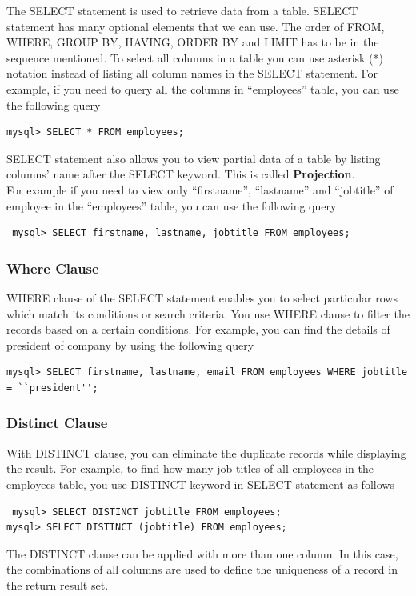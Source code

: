 \documentclass[11pt,a4paper]{article}
\begin{document}
\vspace{5in}

The SELECT statement is used to retrieve data from a table. SELECT statement has many optional elements that we can use. The order of FROM, WHERE, GROUP
BY, HAVING, ORDER BY and LIMIT has to be in the sequence mentioned.
To select all columns in a table you can use asterisk (*) notation instead of listing all column names in the SELECT statement.
For example, if you need to query all the columns in ``employees'' table, you can use the following query\\
\begin{verbatim}
mysql> SELECT * FROM employees;
\end{verbatim}
SELECT statement also allows you to view partial data of a table by listing columns' name after the SELECT keyword. This is called \textbf{Projection}.\\

For example if you need to view only ``firstname'', ``lastname'' and ``jobtitle'' of employee in the ``employees'' table, you can use the following query
\begin{verbatim}
 mysql> SELECT firstname, lastname, jobtitle FROM employees;
\end{verbatim}

\subsubsection*{Where Clause}
WHERE clause of the SELECT statement enables you to select particular rows which match its conditions or search criteria. You use WHERE clause to filter the
records based on a certain conditions.
For example, you can find the details of president of company by using the following query
\begin{verbatim}
mysql> SELECT firstname, lastname, email FROM employees WHERE jobtitle = ``president''; 
\end{verbatim}
\subsubsection*{Distinct Clause}
With DISTINCT clause, you can eliminate the duplicate records while displaying the result.
For example, to find how many job titles of all employees in the employees table, you use DISTINCT keyword in SELECT statement as follows
\begin{verbatim}
 mysql> SELECT DISTINCT jobtitle FROM employees;
mysql> SELECT DISTINCT (jobtitle) FROM employees;
\end{verbatim}
The DISTINCT clause can be applied with more than one column. In this case, the combinations of all columns are used to define the uniqueness of a record in the
return result set.
\end{document}
